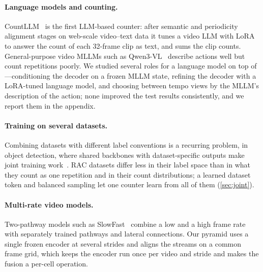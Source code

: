 \paragraph{Language models and counting.}
CountLLM~\cite{yao2025countllm} is the first LLM-based counter: after semantic
and periodicity alignment stages on web-scale video--text data it tunes a video
LLM with LoRA to answer the count of each 32-frame clip as text, and sums the clip
counts. General-purpose video MLLMs such as Qwen3-VL~\cite{qwen3vl} describe
actions well but count repetitions poorly. We studied several roles for a language
model on top of \method---conditioning the decoder on a frozen MLLM state,
refining the decoder with a LoRA-tuned language model, and choosing between tempo
views by the MLLM's description of the action; none improved the test results
consistently, and we report them in the appendix.

\paragraph{Training on several datasets.}
Combining datasets with different label conventions is a recurring problem, \eg
in object detection, where shared backbones with dataset-specific outputs make
joint training work~\cite{zhou2022multidataset}. RAC datasets differ less in
their label space than in what they count as one repetition and in their count
distributions; a learned dataset token and balanced sampling let one counter
learn from all of them (\cref{sec:joint}).

\paragraph{Multi-rate video models.}
Two-pathway models such as SlowFast~\cite{feichtenhofer2019slowfast} combine a
low and a high frame rate with separately trained pathways and lateral
connections. Our pyramid uses a single frozen encoder at several strides and
aligns the streams on a common frame grid, which keeps the encoder run once per
video and stride and makes the fusion a per-cell operation.
